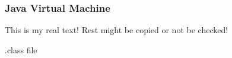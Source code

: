 \subsubsection{Java Virtual Machine} \label{subsubsection:android-evolution-jvm}
This is my real text! Rest might be copied or not be checked!



.class file
